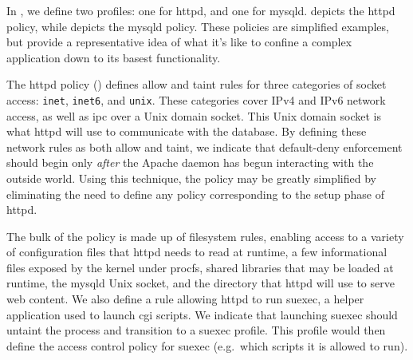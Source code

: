 \subsubsection{\bpfbox{}}

In \bpfbox{}, we define two profiles: one for httpd, and one for mysqld.
 depicts the httpd policy, while  depicts
the mysqld policy. These policies are simplified examples, but provide a representative
idea of what it's like to confine a complex application down to its basest functionality.

The httpd policy () defines allow and taint rules for three
categories of socket access: \texttt{inet}, \texttt{inet6}, and \texttt{unix}. These
categories cover IPv4 and IPv6 network access, as well as \gls{ipc} over a Unix domain
socket. This Unix domain socket is what httpd will use to communicate with the database.
By defining these network rules as both allow and taint, we indicate that default-deny
enforcement should begin only \textit{after} the Apache daemon has begun interacting with
the outside world. Using this technique, the \bpfbox{} policy may be greatly simplified by
eliminating the need to define any policy corresponding to the setup phase of httpd.

The bulk of the \bpfbox{} policy is made up of filesystem rules, enabling access to
a variety of configuration files that httpd needs to read at runtime, a few informational
files exposed by the kernel under procfs, shared libraries that may be loaded at runtime,
the mysqld Unix socket, and the directory that httpd will use to serve web content. We
also define a rule allowing httpd to run suexec, a helper application used to launch
\gls{cgi} scripts.  We indicate that launching suexec should untaint the process and
transition to a suexec profile.  This profile would then define the access control policy
for suexec (e.g.~which scripts it is allowed to run).

\clearpage

